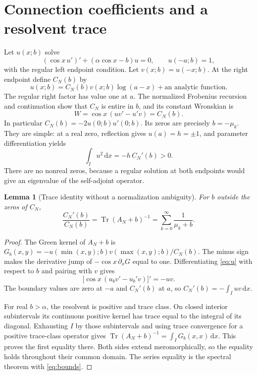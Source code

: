 \documentclass[10pt]{article}
\newtheorem{lemma}[theorem]{Lemma}
\newcommand{\dd}{\mathrm d}
\newcommand{\Tr}{\operatorname{Tr}}
\begin{document}
\section{Connection coefficients and a resolvent trace}
Let $u(x;b)$ solve
\begin{equation}
(\cos x\,u')'+(\alpha\cos x-b)u=0,\qquad u(-a;b)=1,
\label{eq:u}
\end{equation}
with the regular left endpoint condition. Let $v(x;b)=u(-x;b)$.
At the right endpoint define $C_N(b)$ by
\[
u(x;b)=C_N(b)v(x;b)\log(a-x)+\text{an analytic function}.
\]
The regular right factor has value one at $a$. The normalized Frobenius
recursion and continuation show that $C_N$ is entire in $b$, and
its constant Wronskian is
\begin{equation}
W=\cos x\,(uv'-u'v)=C_N(b).
\label{eq:W}
\end{equation}
In particular $C_N(b)=-2u(0;b)u'(0;b)$.
Its zeros are precisely $b=-\mu_k$. They are simple:
at a real zero, reflection gives $u(a)=h=\pm1$, and parameter
differentiation yields
\begin{equation}
\int_I u^2\,\dd x=-h\,C_N'(b)>0.
\label{eq:norm}
\end{equation}
There are no nonreal zeros, because a regular solution at both endpoints
would give an eigenvalue of the self-adjoint operator.

\begin{lemma}[Trace identity without a normalization ambiguity]
For $b$ outside the zeros of $C_N$,
\begin{equation}
\frac{C_N'(b)}{C_N(b)}
=\Tr(A_N+b)^{-1}
=\sum_{k=0}^\infty\frac1{\mu_k+b}.
\label{eq:trace}
\end{equation}
\end{lemma}
\begin{proof}
The Green kernel of $A_N+b$ is
$G_b(x,y)=-u(\min(x,y);b)v(\max(x,y);b)/C_N(b)$.
The minus sign makes the derivative jump of $-\cos x\,\partial_xG$
equal to one. Differentiating \eqref{eq:u} with respect to $b$ and
pairing with $v$ gives
\[
\bigl[\cos x\,(u_bv'-u_b'v)\bigr]'=-uv.
\]
The boundary values are zero at $-a$ and $C_N'(b)$ at $a$, so
$C_N'(b)=-\int_Iuv\,\dd x$.

For real $b>\alpha$, the resolvent is positive and trace class.
On closed interior subintervals its continuous positive kernel has
trace equal to the integral of its diagonal. Exhausting $I$ by those
subintervals and using trace convergence for a positive trace-class
operator gives $\Tr(A_N+b)^{-1}=\int_I G_b(x,x)\,\dd x$.
This proves the first equality there. Both sides extend meromorphically,
so the equality holds throughout their common domain.
The series equality is the spectral theorem with \eqref{eq:bounds}.
\end{proof}
\end{document}
